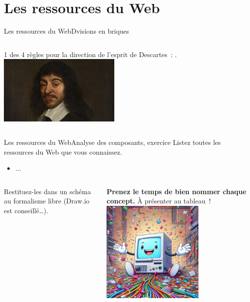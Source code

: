 \documentclass{beamer}
\begin{document}
    \section{Les ressources du Web}\label{sec:ressources}

    \begin{frame}{Les ressources du Web}{Dvisions en briques}
        \begin{columns}
            1 des 4 règles pour la direction de l'esprit de Descartes~: .
            \centering
            \includegraphics[width=6cm]{image/Descartes}
        \end{columns}
    \end{frame}

    \begin{frame}{Les ressources du Web}{Analyse des composants, exercice \execcounterdispinc}
        Listez toutes les ressources du Web que vous connaissez.
        \begin{itemize}
            \item ...
        \end{itemize}
        \bigbreak
        \begin{columns}
            Restituez-les dans un schéma au formalisme libre (Draw.io est conseillé\ldots).

            \textbf{Prenez le temps de bien nommer chaque concept.}
            \bigbreak
            À présenter au tableau~!
            \centering
            \includegraphics[width=5cm]{image/computer-n-web-ressources}
        \end{columns}
    \end{frame}
\end{document}
